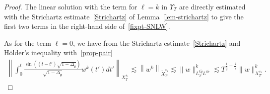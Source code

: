 \documentclass[10pt]{amsart}
\theoremstyle{definition}\newtheorem{defi}[theo]{Definition}\newtheorem{rema}[theo]{Remark}\newtheorem{exam}[theo]{Example}\newtheorem{exem}[theo]{Example}\newtheorem{nota}[theo]{Notation}
\newcommand{\g}{\mathfrak{g}}
\newcommand{\Dlg}{\Delta_{\g}}
\newcommand{\les}{\lesssim}
\begin{document}
\begin{proof}
The linear solution with the term for $\ell=k$ in $\Upsilon_T$ are directly estimated with the Strichartz estimate~\eqref{Strichartz} of Lemma~\ref{lem-strichartz} to give the first two terms in the right-hand side of~\eqref{fixpt-SNLW}.

As for the term $\ell=0$, we have from the Strichartz estimate~\eqref{Strichartz} and H\"older's inequality with~\eqref{prop-pair}
\begin{align*}
\left\|\int_0^t\frac{\sin\left((t-t')\sqrt{1-\Dlg}\right)}{\sqrt{1-\Dlg}}w^{k}(t')dt'\right\|_{X^{s_1}_T}\les \left\|w^k\right\|_{\widetilde{X}^{s_1}_T} \les \|w\|_{L^{k\widetilde{q}}_TL^{k\widetilde{r}}}^k \les T^{\frac1{\widetilde{q}}-\frac{k}{q}}\|w\|_{X^{s_1}_T}^k.
\end{align*}


\end{proof}
\end{document}
